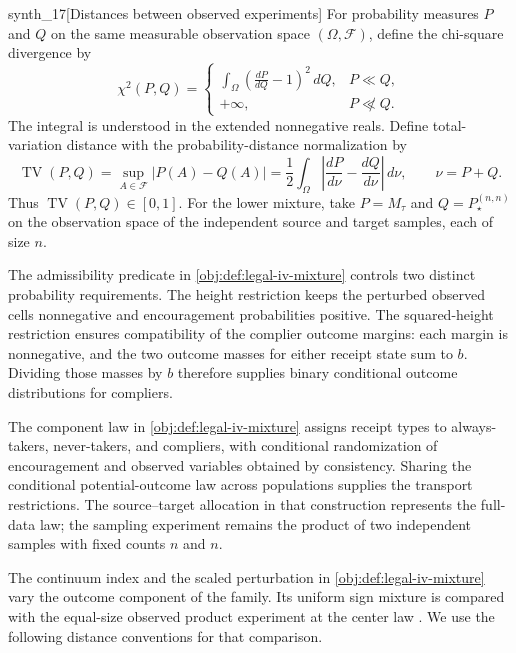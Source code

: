 \begin{definitionv}{synth_17}[Distances between observed experiments]
For probability measures \(P\) and \(Q\) on the same measurable observation space \((\Omega,\mathcal F)\), define the chi-square divergence by
\[
\chi^2(P,Q)=
\begin{cases}
\displaystyle\int_\Omega
\left(\frac{dP}{dQ}-1\right)^2\,dQ,&P\ll Q,\\
+\infty,&P\not\ll Q.
\end{cases}
\]
The integral is understood in the extended nonnegative reals. Define total-variation distance with the probability-distance normalization by
\[
\operatorname{TV}(P,Q)
=\sup_{A\in\mathcal F}|P(A)-Q(A)|
=\frac12\int_\Omega
\left|\frac{dP}{d\nu}-\frac{dQ}{d\nu}\right|\,d\nu,
\qquad \nu=P+Q.
\]
Thus \(\operatorname{TV}(P,Q)\in[0,1]\). For the lower mixture, take \(P=M_\tau\) and \(Q=P_\star^{(n,n)}\) on the observation space of the independent source and target samples, each of size \(n\).
\end{definitionv}

The admissibility predicate  in \cref{obj:def:legal-iv-mixture} controls two distinct probability requirements. The height restriction keeps the perturbed observed cells nonnegative and encouragement probabilities positive. The squared-height restriction ensures compatibility of the complier outcome margins: each margin is nonnegative, and the two outcome masses for either receipt state sum to \(b\). Dividing those masses by \(b\) therefore supplies binary conditional outcome distributions for compliers.

The component law  in \cref{obj:def:legal-iv-mixture} assigns receipt types to always-takers, never-takers, and compliers, with conditional randomization of encouragement and observed variables obtained by consistency. Sharing the conditional potential-outcome law across populations supplies the transport restrictions. The source--target allocation in that construction represents the full-data law; the sampling experiment remains the product of two independent samples with fixed counts \(n\) and \(n\).

The continuum index  and the scaled perturbation  in \cref{obj:def:legal-iv-mixture} vary the outcome component of the family. Its uniform sign mixture  is compared with the equal-size observed product experiment at the center law . We use the following distance conventions for that comparison.

